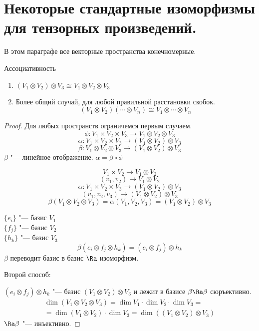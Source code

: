 ﻿\section{Некоторые стандартные изоморфизмы для тензорных произведений.}
В этом параграфе все векторные пространства конечномерные.

\begin{theorem}{Ассоциативность}\hfill
\begin{enumerate}
    \item $(V_1 \otimes V_2) \otimes V_3 \cong V_1 \otimes V_2 \otimes V_3$
    \item Более общий случай, для любой правильной расстановки скобок. 
    $$(V_1 \otimes V_2)(\cdots \otimes V_n) \cong  V_1 \otimes \cdots \otimes V_n$$
\end{enumerate}
\end{theorem}
\begin{proof}
Для любых пространств ограничемся первым случаем. 
$$\phi \colon V_1 \times V_2 \times V_3 \to V_1 \otimes V_2 \otimes V_3$$
$$\alpha \colon V_1 \times V_2 \times V_3 \to (V_1 \otimes V_2) \otimes V_3$$
$$\beta\colon V_1 \otimes V_2 \otimes V_3 \to (V_1 \otimes V_2)\otimes V_3$$
$\beta$ "--- линейное отображение. $\alpha = \beta \circ \phi$

$$V_1 \times V_2 \to V_1 \otimes V_2$$
$$(v_1, v_2) \to V_1 \otimes V_2$$
$$\alpha \colon V_1 \times V_2 \times V_3 \to (V_1 \otimes V_2) \otimes V_3$$
$$(v_1, v_2, v_3) \to  (V_1 \otimes V_2) \otimes V_3$$
$$\beta(V_1 \otimes V_2 \otimes V_3) = \alpha(V_1, V_2, V_3) = (V_1 \otimes V_2) \otimes V_3$$

$\{e_i\}$ "--- базис $V_1$\\
$\{f_j\}$ "--- базис $V_2$\\
$\{h_k\}$ "--- базис $V_3$\\
$$\beta(e_i \otimes f_j \otimes h_k) = (e_i \otimes f_j) \otimes h_k$$
$\beta$ переводит базис в базис $\Ra$ изоморфизм.

Второй способ:

$(e_i \otimes f_j) \otimes h_k$ "--- базис $(V_1 \otimes V_2) \otimes V_3$
и лежит в базисе $\beta \Ra \beta$ сюръективно.
\begin{gather*}
\dim(V_1 \otimes V_2 \otimes V_3) = \dim V_1 \cdot \dim V_2 \cdot \dim V_3 =\\
=\dim(V_1 \otimes V_2) \cdot \dim V_3 = \dim((V_1 \otimes V_2) \otimes V_3)
\end{gather*}
$\Ra \beta$ "--- инъективно. 
\end{proof}
